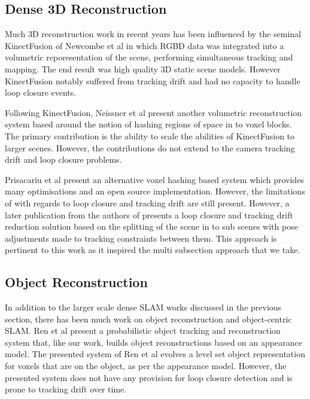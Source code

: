 \subsection{Dense 3D Reconstruction}
Much 3D reconstruction work in recent years has been influenced by the seminal KinectFusion\cite{Newcombe2011} of Newcombe et al in which
RGBD data was integrated into a volumetric reporesentation  of the scene, performing simultaneous tracking and mapping. The end result was
high quality 3D static scene models.  However KinectFusion notably suffered from tracking drift and had no capacity to handle loop closure
events.

Following KinectFusion, Neissner et al present another volumetric reconstruction system\cite{Niessner2013} based around the notion of
hashing regions of space in to voxel blocks.  The primary contribution is the ability to scale the abilities of KinectFusion to larger
scenes. However, the contributions do not extend to the camera tracking drift and loop closure problems.

Prisacariu et al present an alternative voxel hashing based system\cite{Prisacariu2014} which provides many optimisations and an open source 
implementation. However, the limitations of\cite{Newcombe2011,Niessner2013} with regards to loop closure and tracking drift are still present. 
However, a later publication\cite{Kahler2016} from the authors of\cite{Prisacariu2014} presents a loop closure and tracking drift reduction 
solution based on the splitting of the scene in to sub scenes with pose adjustments made to tracking constraints between them. This approach 
is pertinent to this work as it inspired the multi subsection approach that we take. 

\subsection{Object Reconstruction}

In addition to the larger scale dense SLAM works discussed in the previous section, there has been much work on object reconstruction and 
object-centric SLAM. Ren et al present a probabilistic object tracking and reconstruction system\cite{Ren2013}  that, like our work, builds 
object reconstructions based on an appearance model. The presented system of Ren et al  evolves a level set object representation for voxels that 
are on the object, as per the appearance model. However, the presented system does not have any provision for loop closure detection and 
is prone to tracking drift over time.

